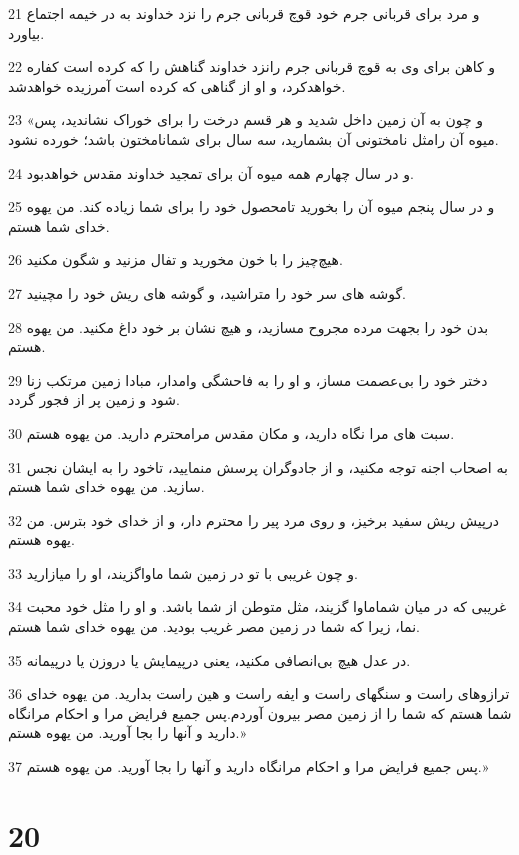 \par 21 و مرد برای قربانی جرم خود قوچ قربانی جرم را نزد خداوند به در خیمه اجتماع بیاورد.
\par 22 و کاهن برای وی به قوچ قربانی جرم رانزد خداوند گناهش را که کرده است کفاره خواهدکرد، و او از گناهی که کرده است آمرزیده خواهدشد.
\par 23 «و چون به آن زمین داخل شدید و هر قسم درخت را برای خوراک نشاندید، پس میوه آن رامثل نامختونی آن بشمارید، سه سال برای شمانامختون باشد؛ خورده نشود.
\par 24 و در سال چهارم همه میوه آن برای تمجید خداوند مقدس خواهدبود.
\par 25 و در سال پنجم میوه آن را بخورید تامحصول خود را برای شما زیاده کند. من یهوه خدای شما هستم.
\par 26 هیچ‌چیز را با خون مخورید و تفال مزنید و شگون مکنید.
\par 27 گوشه های سر خود را متراشید، و گوشه های ریش خود را مچینید.
\par 28 بدن خود را بجهت مرده مجروح مسازید، و هیچ نشان بر خود داغ مکنید. من یهوه هستم.
\par 29 دختر خود را بی‌عصمت مساز، و او را به فاحشگی وامدار، مبادا زمین مرتکب زنا شود و زمین پر از فجور گردد.
\par 30 سبت های مرا نگاه دارید، و مکان مقدس مرامحترم دارید. من یهوه هستم.
\par 31 به اصحاب اجنه توجه مکنید، و از جادوگران پرسش منمایید، تاخود را به ایشان نجس سازید. من یهوه خدای شما هستم.
\par 32 در‌پیش ریش سفید برخیز، و روی مرد پیر را محترم دار، و از خدای خود بترس. من یهوه هستم.
\par 33 و چون غریبی با تو در زمین شما ماواگزیند، او را میازارید.
\par 34 غریبی که در میان شماماوا گزیند، مثل متوطن از شما باشد. و او را مثل خود محبت نما، زیرا که شما در زمین مصر غریب بودید. من یهوه خدای شما هستم.
\par 35 در عدل هیچ بی‌انصافی مکنید، یعنی در‌پیمایش یا دروزن یا در‌پیمانه.
\par 36 ترازوهای راست و سنگهای راست و ایفه راست و هین راست بدارید. من یهوه خدای شما هستم که شما را از زمین مصر بیرون آوردم.پس جمیع فرایض مرا و احکام مرانگاه دارید و آنها را بجا آورید. من یهوه هستم.»
\par 37 پس جمیع فرایض مرا و احکام مرانگاه دارید و آنها را بجا آورید. من یهوه هستم.»
 
\chapter{20}

